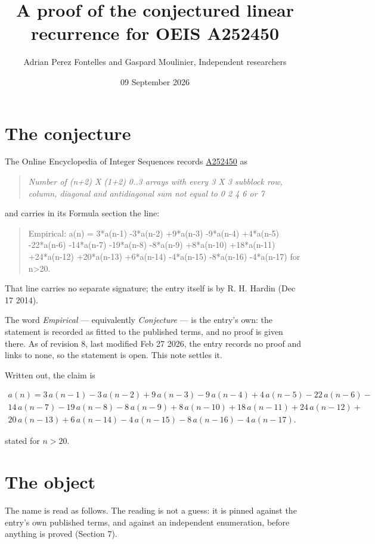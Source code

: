 \documentclass[11pt]{article}
\title{A proof of the conjectured linear recurrence for OEIS A252450}
\author{Adrian Perez Fontelles and Gaspard Moulinier, Independent researchers}
\date{09 September 2026}
\theoremstyle{definition}
\begin{document}
\maketitle
\section{The conjecture}

The Online Encyclopedia of Integer Sequences records \href{https://oeis.org/A252450}{A252450} as

\begin{quote}\itshape Number of (n+2) X (1+2) 0..3 arrays with every 3 X 3 subblock row, column, diagonal and antidiagonal sum not equal to 0 2 4 6 or 7\end{quote}

and carries in its Formula section the line:

\begin{quote}\ttfamily Empirical: a(n) = 3*a(n-1) -3*a(n-2) +9*a(n-3) -9*a(n-4) +4*a(n-5) -22*a(n-6) -14*a(n-7) -19*a(n-8) -8*a(n-9) +8*a(n-10) +18*a(n-11) +24*a(n-12) +20*a(n-13) +6*a(n-14) -4*a(n-15) -8*a(n-16) -4*a(n-17) for n>20.\end{quote}

That line carries no separate signature; the entry itself is by R. H. Hardin (Dec 17 2014).

The word {\itshape Empirical} --- equivalently {\itshape Conjecture} --- is the entry's own: the statement is recorded as fitted to the published terms, and no proof is given there. As of revision 8, last modified Feb 27 2026, the entry records no proof and links to none, so the statement is open. This note settles it.

Written out, the claim is

\begin{multline*} a(n) = 3\,a(n-1) - 3\,a(n-2) + 9\,a(n-3) - 9\,a(n-4) + 4\,a(n-5) - 22\,a(n-6) - \\ 14\,a(n-7) - 19\,a(n-8) - 8\,a(n-9) + 8\,a(n-10) + 18\,a(n-11) + 24\,a(n-12) + \\ 20\,a(n-13) + 6\,a(n-14) - 4\,a(n-15) - 8\,a(n-16) - 4\,a(n-17). \end{multline*}

stated for $n > 20$.

\section{The object}

The name is read as follows. The reading is not a guess: it is pinned against the entry's own published terms, and against an independent enumeration, before anything is proved (Section 7).
\end{document}
